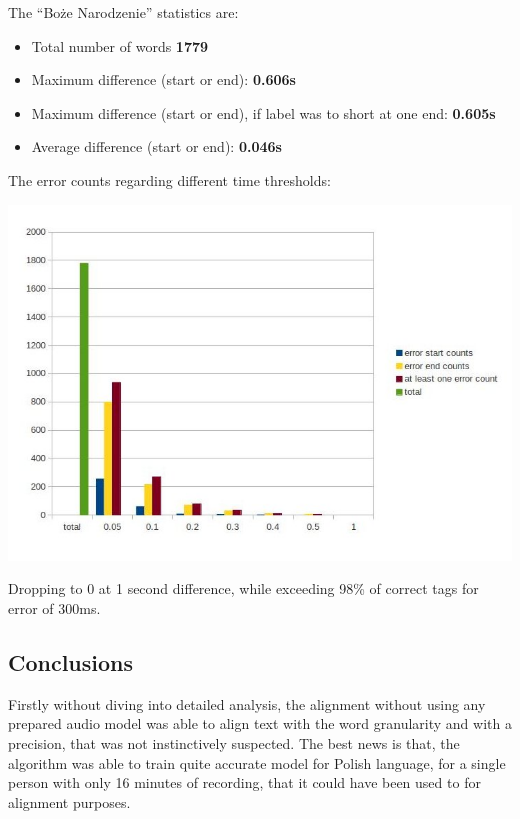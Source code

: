 \documentclass[12pt,a4paper,english]{article}
\begin{document}
\newpage
The “Boże Narodzenie” statistics are: \newline
\begin{itemize}
    \item Total number of words				\textbf{1779}
    \item Maximum difference (start or end): 			\textbf{0.606s}
    \item Maximum difference (start or end), if label was to short at one end: 			\textbf{0.605s}
    \item Average difference  (start or end):			\textbf{0.046s}
\end{itemize}
The error counts regarding different time thresholds:
\begin{center}
    \includegraphics[scale=0.6]{boze_narodzenie_length_based_counts.jpg}
\end{center}
Dropping to 0 at 1 second difference, while exceeding 98\% of correct tags for error of 300ms.

\newpage
\subsection{Conclusions}

Firstly without diving into detailed analysis, the alignment without using any prepared audio model was able to align text with the word granularity and with a precision, that was not instinctively suspected. \newline
The best news is that, the algorithm was able to train quite accurate model for Polish language, for a single person with only 16 minutes of recording, that it could have been used to for alignment purposes. \newline
\end{document}
